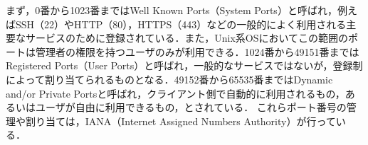 まず，0番から1023番まではWell Known Ports（System Ports）と呼ばれ，例えばSSH（22）やHTTP（80），HTTPS（443）などの一般的によく利用される主要なサービスのために登録されている．また，Unix系OSにおいてこの範囲のポートは管理者の権限を持つユーザのみが利用できる．1024番から49151番まではRegistered Ports（User Ports）と呼ばれ，一般的なサービスではないが，登録制によって割り当てられるものとなる．49152番から65535番まではDynamic and/or Private Portsと呼ばれ，クライアント側で自動的に利用されるもの，あるいはユーザが自由に利用できるもの，とされている．
これらポート番号の管理や割り当ては，IANA（Internet Assigned Numbers Authority）が行っている．

